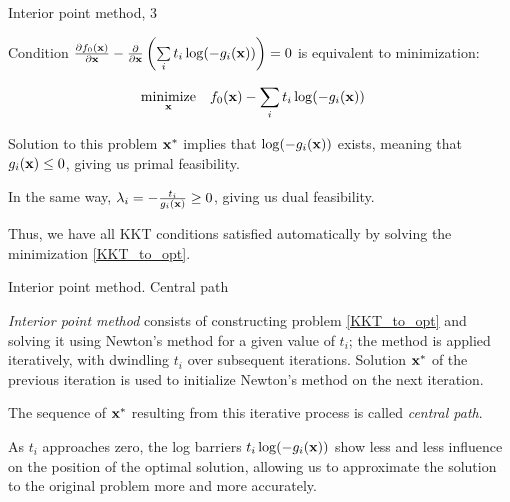 \documentclass{beamer}
\begin{document}
\begin{frame}{Interior point method, 3}
	\begin{flushleft}
		
		Condition $\frac{\partial f_0(\mathbf{x})}{\partial \mathbf{x}} 
		-
		\frac{\partial}{\partial \mathbf{x}} 
		\left(
		\sum\limits_i 
		t_i \log (- g_i (\mathbf{x})) 
		\right) = 0$ is equivalent to minimization:
		
		
		\begin{equation}
			\label{KKT_to_opt}
			\begin{aligned}
				& \underset{\mathbf{x}}{\text{minimize}}
				& & f_0(\mathbf{x}) - 
				\sum\limits_i t_i \log (- g_i (\mathbf{x})) 
			\end{aligned}
		\end{equation}
		
		Solution to this problem $\mathbf{x}^*$ implies that $\log (- g_i (\mathbf{x}))$ exists, meaning that $g_i (\mathbf{x}) \leq 0$, giving us primal feasibility.
		
		\bigskip
		
		In the same way, $\lambda_i = -\frac{t_i}{g_i(\mathbf{x})} \geq 0$, giving us dual feasibility.
		
		\bigskip
		
		Thus, we have all KKT conditions satisfied automatically by solving the minimization \eqref{KKT_to_opt}.
		
	\end{flushleft}
\end{frame}



\begin{frame}{Interior point method. Central path}
	\begin{flushleft}
		
		\emph{Interior point method} consists of constructing problem \eqref{KKT_to_opt} and solving it using Newton's method for a given value of $t_i$; the method is applied iteratively, with dwindling $t_i$ over subsequent iterations. Solution $\mathbf{x}^*$ of the previous iteration is used to initialize Newton's method on the next iteration.
		
		\bigskip
		
		The sequence of $\mathbf{x}^*$ resulting from this iterative process is called \emph{central path}. 
		
		\bigskip
		
		As $t_i$ approaches zero, the log barriers $t_i \log (- g_i (\mathbf{x}))$ show less and less influence on the position of the optimal solution, allowing us to approximate the solution to the original problem more and more accurately.
		
	\end{flushleft}
\end{frame}
\end{document}
